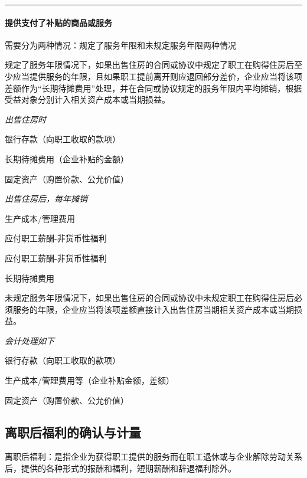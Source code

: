 \documentclass[UTF8,12pt]{ctexart}
\newenvironment{Dr}{%
	\begin{list}{}%
		{
			\setlength{\leftmargin}{2em}
			\setlength{\labelwidth}{2em}
			\setlength{\labelsep}{0pt}
			\setlength{\itemindent}{0pt}
			\setlength{\listparindent}{0pt}
			\setlength{\parsep}{0pt}
			\setlength{\topsep}{0pt}
		}
		\item[\textbf{借：}]
	}{%
	\end{list}
}
\newenvironment{Cr}{%
	\begin{list}{}%
		{
			\setlength{\leftmargin}{2em}
			\setlength{\labelwidth}{2em}
			\setlength{\labelsep}{0pt}
			\setlength{\itemindent}{0pt}
			\setlength{\listparindent}{0pt}
			\setlength{\parsep}{0pt}
			\setlength{\topsep}{0pt}
		}
		\item[\textbf{贷：}]
	}{%
	\end{list}
}
\numberwithin{equation}{section} %
\numberwithin{figure}{section}
\numberwithin{table}{section}
\begin{document}
	\vspace{5pt}
	\hrule
	\vspace{5pt}


	\paragraph{提供支付了补贴的商品或服务}
	需要分为两种情况：规定了服务年限和未规定服务年限两种情况
	
	规定了服务年限情况下，如果出售住房的合同或协议中规定了职工在购得住房后至少应当提供服务的年限，且如果职工提前离开则应退回部分差价，企业应当将该项差额作为“长期待摊费用”处理，并在合同或协议规定的服务年限内平均摊销，根据受益对象分别计入相关资产成本或当期损益。
	
	\textit{出售住房时}
	
	\begin{Dr}
		银行存款（向职工收取的款项）
		
		长期待摊费用（企业补贴的金额）
	\end{Dr}
	\begin{Cr}
		固定资产（购置价款、公允价值） 
	\end{Cr}
	
	\textit{出售住房后，每年摊销}
	
	\begin{Dr}
		生产成本/管理费用
	\end{Dr}
	\begin{Cr}
		应付职工薪酬-非货币性福利
	\end{Cr}
	
	\begin{Dr}
		应付职工薪酬-非货币性福利
	\end{Dr}
	\begin{Cr}
		长期待摊费用
	\end{Cr}

	未规定服务年限情况下，如果出售住房的合同或协议中未规定职工在购得住房后必须服务的年限，企业应当将该项差额直接计入出售住房当期相关资产成本或当期损益。
	
	\textit{会计处理如下}
	
	\begin{Dr}
		银行存款（向职工收取的款项）
		
		生产成本/管理费用等（企业补贴金额，差额） 
	\end{Dr}
	\begin{Cr}
		固定资产（购置价款、公允价值）
	\end{Cr}
	
	\subsection{离职后福利的确认与计量}
	离职后福利：是指企业为获得职工提供的服务而在职工退休或与企业解除劳动关系后，提供的各种形式的报酬和福利，短期薪酬和辞退福利除外。
	
\end{document}
